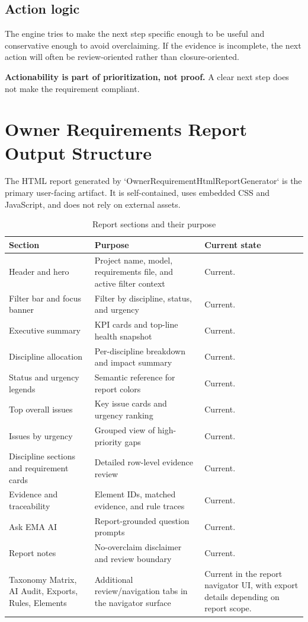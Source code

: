 \documentclass[10pt,letterpaper]{article}
\newcommand{\strong}[1]{\textbf{\textcolor{emaNavy}{#1}}}
\newcommand{\keyconcept}[1]{%
\begin{tcolorbox}[colback=emaSoft,borderline west={3pt}{0pt}{emaBlue}]
\small #1
\end{tcolorbox}}
\begin{document}
\subsection{Action logic}

The engine tries to make the next step specific enough to be useful and conservative enough to avoid overclaiming. If the evidence is incomplete, the next action will often be review-oriented rather than closure-oriented.

\keyconcept{\strong{Actionability is part of prioritization, not proof.} A clear next step does not make the requirement compliant.}

\section{Owner Requirements Report Output Structure}

The HTML report generated by `OwnerRequirementHtmlReportGenerator` is the primary user-facing artifact. It is self-contained, uses embedded CSS and JavaScript, and does not rely on external assets.

\begin{longtable}{p{1.6in}p{2.8in}p{2.3in}}
\caption{Report sections and their purpose}\\
\toprule
\textbf{Section} & \textbf{Purpose} & \textbf{Current state} \\
\midrule
\endhead
Header and hero & Project name, model, requirements file, and active filter context & Current. \\
Filter bar and focus banner & Filter by discipline, status, and urgency & Current. \\
Executive summary & KPI cards and top-line health snapshot & Current. \\
Discipline allocation & Per-discipline breakdown and impact summary & Current. \\
Status and urgency legends & Semantic reference for report colors & Current. \\
Top overall issues & Key issue cards and urgency ranking & Current. \\
Issues by urgency & Grouped view of high-priority gaps & Current. \\
Discipline sections and requirement cards & Detailed row-level evidence review & Current. \\
Evidence and traceability & Element IDs, matched evidence, and rule traces & Current. \\
Ask EMA AI & Report-grounded question prompts & Current. \\
Report notes & No-overclaim disclaimer and review boundary & Current. \\
Taxonomy Matrix, AI Audit, Exports, Rules, Elements & Additional review/navigation tabs in the navigator surface & Current in the report navigator UI, with export details depending on report scope. \\
\bottomrule
\end{longtable}
\end{document}
